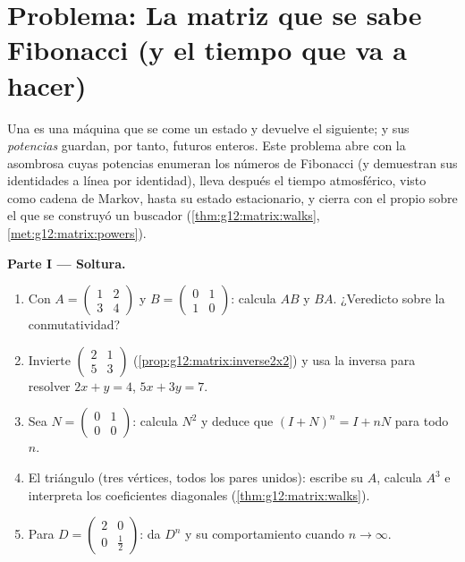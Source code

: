\section{Problema: La matriz que se sabe Fibonacci (y el tiempo que va a
hacer)}

\begin{problem}
\label{pb:g12:matrix:1}
Una  es una máquina que se come un estado y devuelve el siguiente; y
sus \emph{potencias} guardan, por tanto, futuros enteros. Este problema
abre con la asombrosa  cuyas potencias enumeran los números de
Fibonacci (y demuestran sus identidades a línea por identidad), lleva
después el tiempo atmosférico, visto como cadena de Markov, hasta su estado
estacionario, y cierra con el  propio sobre el que se construyó un
buscador (\cref{thm:g12:matrix:walks}, \cref{met:g12:matrix:powers}).

\medskip
\noindent\textbf{Parte I --- Soltura.}
\begin{enumerate}
  \item Con $A = \begin{pmatrix} 1 & 2\\ 3 & 4\end{pmatrix}$ y
        $B = \begin{pmatrix} 0 & 1\\ 1 & 0\end{pmatrix}$: calcula $AB$ y
        $BA$. ¿Veredicto sobre la conmutatividad?
  \item Invierte $\begin{pmatrix} 2 & 1\\ 5 & 3\end{pmatrix}$
        (\cref{prop:g12:matrix:inverse2x2}) y usa la inversa para resolver
        $2x + y = 4$, $5x + 3y = 7$.
  \item Sea $N = \begin{pmatrix} 0 & 1\\ 0 & 0\end{pmatrix}$: calcula
        $N^2$ y deduce que $(I + N)^n = I + nN$ para todo $n$.
  \item El  triángulo (tres vértices, todos los pares unidos):
        escribe su  $A$, calcula $A^3$ e interpreta los
        coeficientes diagonales (\cref{thm:g12:matrix:walks}).
  \item Para $D = \begin{pmatrix} 2 & 0\\ 0 & \frac12 \end{pmatrix}$: da
        $D^n$ y su comportamiento cuando $n \to \infty$.
\end{enumerate}


\end{problem}
